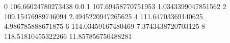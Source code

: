 0 106.66024780273438 0.0
1 107.69458770751953 1.0343399047851562
2 109.15476989746094 2.4945220947265625
4 111.64703369140625 4.986785888671875
6 114.03459167480469 7.3743438720703125
8 118.51810455322266 11.857856750488281
